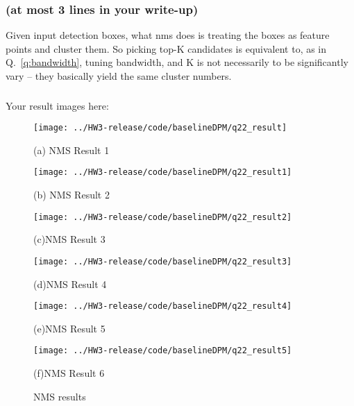 \documentclass[12pt]{article}
\newcounter{list}
\begin{document}


\subsubsection{(at most 3 lines in your write-up)}
Given input detection boxes, what nms does is treating the boxes as feature points and cluster them. So picking top-K candidates is equivalent to, as in Q.~\ref{q:bandwidth}, tuning bandwidth, and K is not necessarily to be significantly vary -- they basically yield the same cluster numbers.

\subsubsection{}

Your result images here:

\begin{figure}[H]
  \centering
  \begin{minipage}[t]{0.45\textwidth}
  \centering
  \texttt{[image: ../HW3-release/code/baselineDPM/q22\_result]}
  \caption*{(a) NMS Result 1 }
  \end{minipage}
\hfill
  \begin{minipage}[t]{.45\textwidth}
  \centering
  \texttt{[image: ../HW3-release/code/baselineDPM/q22\_result1]}
  \caption*{(b) NMS Result 2}
  \end{minipage}
\vfill
  \begin{minipage}[t]{.45\textwidth}
  \centering
  \texttt{[image: ../HW3-release/code/baselineDPM/q22\_result2]}
  \caption*{(c)NMS Result 3}
  \end{minipage}
\hfill
  \begin{minipage}[t]{.45\textwidth}
  \centering
  \texttt{[image: ../HW3-release/code/baselineDPM/q22\_result3]}
  \caption*{(d)NMS Result 4}
  \end{minipage}
\vfill
  \begin{minipage}[t]{.45\textwidth}
  \centering
  \texttt{[image: ../HW3-release/code/baselineDPM/q22\_result4]}
  \caption*{(e)NMS Result 5}
  \end{minipage}
\hfill
  \begin{minipage}[t]{.45\textwidth}
  \centering
  \texttt{[image: ../HW3-release/code/baselineDPM/q22\_result5]}
  \caption*{(f)NMS Result 6}
  \end{minipage}

\caption{NMS results}
\label{fig:nms_results}
\end{figure}
\end{document}
